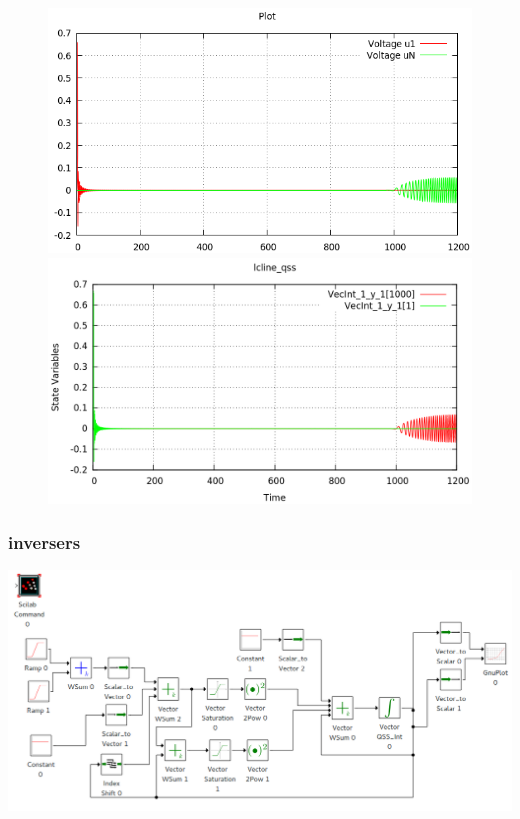 \documentclass[a4paper,	11pt]{report}
\begin{document}
\begin{figure}[H]
\centering
\begin{minipage}{0.5\textwidth}
\centering
 \includegraphics[width=\linewidth]{lcline-pd}
\end{minipage}\hfill
\begin{minipage}{0.5\textwidth}
\centering
 \includegraphics[width=\linewidth]{lcline-qss}
\end{minipage}
\end{figure}

\subsubsection{inversers}

 \includegraphics[width=0.75\linewidth]{inverters}
\end{document}
